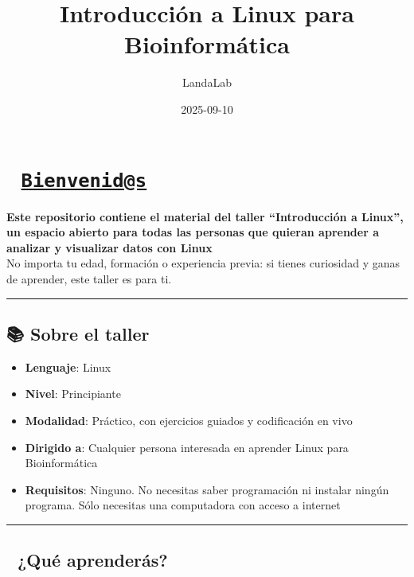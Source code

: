 \documentclass[
]{book}
\title{Introducción a Linux para Bioinformática}
\author{LandaLab}
\date{2025-09-10}
\providecommand{\tightlist}{%
  \setlength{\itemsep}{0pt}\setlength{\parskip}{0pt}}
\begin{document}
\maketitle

{
\setcounter{tocdepth}{1}
\tableofcontents
}
\chapter{\texorpdfstring{🧪 \href{mailto:Bienvenid@s}{\nolinkurl{Bienvenid@s}}}{🧪 Bienvenid@s}}\label{bienvenids}

\textbf{Este repositorio contiene el material del taller ``Introducción a Linux'', un espacio abierto para todas las personas que quieran aprender a analizar y visualizar datos con Linux}\\
No importa tu edad, formación o experiencia previa: si tienes curiosidad y ganas de aprender, este taller es para ti.

\begin{center}\rule{0.5\linewidth}{0.5pt}\end{center}

\section{📚 Sobre el taller}\label{sobre-el-taller}

\begin{itemize}
\tightlist
\item
  \textbf{Lenguaje}: Linux
\item
  \textbf{Nivel}: Principiante\\
\item
  \textbf{Modalidad}: Práctico, con ejercicios guiados y codificación en vivo\\
\item
  \textbf{Dirigido a}: Cualquier persona interesada en aprender Linux para Bioinformática\\
\item
  \textbf{Requisitos}: Ninguno. No necesitas saber programación ni instalar ningún programa. Sólo necesitas una computadora con acceso a internet
\end{itemize}

\begin{center}\rule{0.5\linewidth}{0.5pt}\end{center}

\section{🧰 ¿Qué aprenderás?}\label{quuxe9-aprenderuxe1s}
\end{document}
